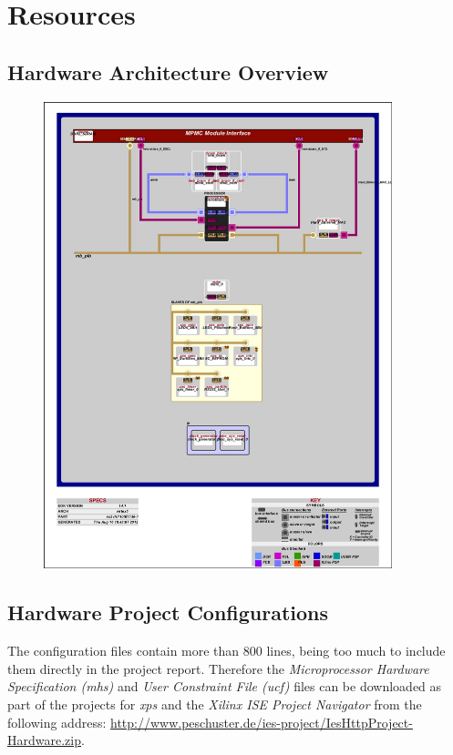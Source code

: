 \chapter{Resources}

\section{Hardware Architecture Overview}
\label{sec:hw_arch}

\begin{figure}[H]
\centering
\includegraphics[width=0.9\textwidth]{images/system_blkd.jpg}
\end{figure}

\section{Hardware Project Configurations}

The configuration files contain more than 800 lines, being too much to include them directly in the project report. Therefore the \textit{Microprocessor Hardware Specification (mhs)} and \textit{User Constraint File (ucf)} files can be downloaded as part of the projects for \textit{\gls{xps}} and the \textit{Xilinx ISE Project Navigator} from the following address: \url{http://www.peschuster.de/ies-project/IesHttpProject-Hardware.zip}.
\\

